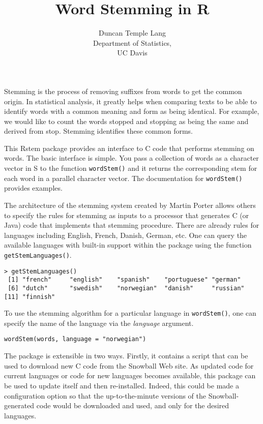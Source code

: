 \documentclass{article}
\title{Word Stemming in R}
\author{Duncan Temple Lang\\
Department of Statistics, \\
UC Davis}
\def\SFunction#1{\texttt{#1()}}
\def\SArg#1{\textsl{#1}}
\begin{document}
\maketitle
Stemming is the process of removing suffixes from words to get the
common origin.  In statistical analysis, it greatly helps when
comparing texts to be able to identify words with a common meaning and
form as being identical. For example, we would like to count the words
stopped and stopping as being the same and derived from stop.
Stemming identifies these common forms.

This Rstem package provides an interface to C code that performs
stemming on words.  The basic interface is simple.  You pass a
collection of words as a character vector in S to the function
\SFunction{wordStem} and it returns the corresponding stem for each
word in a parallel character vector.  The documentation for
\SFunction{wordStem} provides examples.

The architecture of the stemming system 
created by Martin Porter allows others to specify
the rules for stemming as inputs to a processor
that generates C (or Java) code that implements that
stemming procedure. 
There are already rules for languages including
English, French, Danish, German, etc.
One can query the available languages
with built-in support within the package using
the function \SFunction{getStemLanguages}.
\begin{verbatim}
> getStemLanguages()
 [1] "french"     "english"    "spanish"    "portuguese" "german"    
 [6] "dutch"      "swedish"    "norwegian"  "danish"     "russian"   
[11] "finnish"   
\end{verbatim}

To use the stemming algorithm for a particular language in 
\SFunction{wordStem}, one can
specify the name of the language via the \SArg{language} argument.
\begin{verbatim}
wordStem(words, language = "norwegian")
\end{verbatim}


The package is extensible in two ways.  Firstly, it contains a script
that can be used to download new C code from the Snowball Web site.
As updated code for current languages or code for new languages
becomes available, this package can be used to update itself and then
re-installed.  Indeed, this could be made a configuration option so
that the up-to-the-minute versions of the Snowball-generated code
would be downloaded and used, and only for the desired languages.
\end{document}

